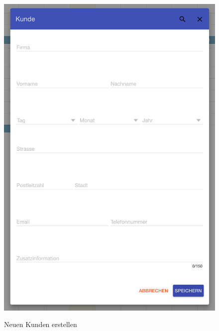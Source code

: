 \begin{figure}[H]
    \centering
    \begin{minipage}[t]{0.49\linewidth}
        \centering
        \includegraphics[width=\linewidth]{images/frontend_customer_new.png}
        \label{frontend_customer_new}
        \caption{Neuen Kunden erstellen}
    \end{minipage}%
    \hfill
    \begin{minipage}[t]{0.49\linewidth}
        \centering

\end{minipage}
\end{figure}
